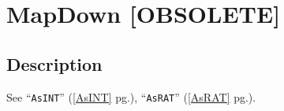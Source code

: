 \documentclass[a4paper]{mybook}
\newenvironment{command}{}{} %
\begin{document}
\section{MapDown [OBSOLETE]}
\label{MapDown [OBSOLETE]}
\begin{command} %



\subsection*{Description}

See ``\verb&AsINT&'' (\ref{AsINT} pg.\pageref{AsINT}), ``\verb&AsRAT&'' (\ref{AsRAT} pg.\pageref{AsRAT}).

\end{command} %
\end{document}
